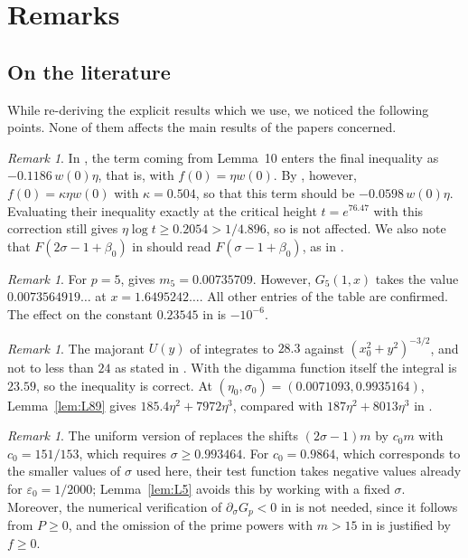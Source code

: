 \documentclass[11pt]{amsart}
\numberwithin{equation}{section}
\theoremstyle{definition}
\theoremstyle{remark}
\newtheorem{remark}[theorem]{Remark}
\newcommand{\eps}{\varepsilon}
\begin{document}
\section{Remarks}\label{sec:remarks}

\subsection{On the literature}
While re-deriving the explicit results which we use, we noticed the following points.
None of them affects the main results of the papers concerned.

\begin{remark}\label{rem:btyf0}
In \cite{BTY}, the term coming from Lemma~10 enters the final inequality as $-0.1186\,w(0)\eta$, that is, with $f(0) = \eta w(0)$.
By \cite[Definition~2]{BTY}, however, $f(0) = \kappa\eta w(0)$ with $\kappa = 0.504$, so that this term should be $-0.0598\,w(0)\eta$.
Evaluating their inequality exactly at the critical height $t = e^{76.47}$ with this correction still gives $\eta\log t \geq 0.2054 > 1/4.896$, so \cite[Theorem~1]{BTY} is not affected.
We also note that $F(2\sigma - 1 + \beta_0)$ in \cite[(25)]{BTY} should read $F(\sigma - 1 + \beta_0)$, as in \cite[(47)]{BTY}.
\end{remark}

\begin{remark}\label{rem:m5}
For $p = 5$, \cite[Table~1]{BTY} gives $m_5 = 0.00735709$.
However, $G_5(1, x)$ takes the value $0.0073564919\ldots$ at $x = 1.6495242\ldots$.
All other entries of the table are confirmed.
The effect on the constant $0.23545$ in \cite{BTY} is $-10^{-6}$.
\end{remark}

\begin{remark}
The majorant $U(y)$ of \cite[(31)]{BTY} integrates to $28.3$ against $(x_0^2 + y^2)^{-3/2}$, and not to less than $24$ as stated in \cite[(32)]{BTY}.
With the digamma function itself the integral is $23.59$, so the inequality \cite[(32)]{BTY} is correct.
At $(\eta_0, \sigma_0) = (0.0071093, 0.9935164)$, Lemma~\ref{lem:L89} gives $185.4\eta^2 + 7972\eta^3$, compared with $187\eta^2 + 8013\eta^3$ in \cite[(48)]{BTY}.
\end{remark}

\begin{remark}
The uniform version of \cite[(21)]{BTY} replaces the shifts $(2\sigma - 1)m$ by $c_0m$ with $c_0 = 151/153$, which requires $\sigma \geq 0.993464$.
For $c_0 = 0.9864$, which corresponds to the smaller values of $\sigma$ used here, their test function takes negative values already for $\eps_0 = 1/2000$; Lemma~\ref{lem:L5} avoids this by working with a fixed $\sigma$.
Moreover, the numerical verification of $\partial_\sigma G_p < 0$ in \cite{BTY} is not needed, since it follows from $P \geq 0$, and the omission of the prime powers with $m > 15$ in \cite[Lemma~10]{BTY} is justified by $f \geq 0$.
\end{remark}
\end{document}
